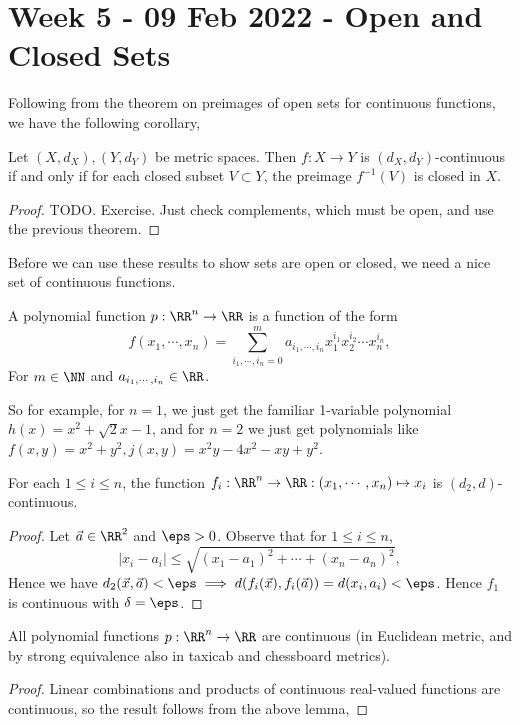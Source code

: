 \section{Week 5 - 09 Feb 2022 - Open and Closed Sets}
Following from the theorem on preimages of open sets for continuous functions,
we have the following corollary,
\begin{corollary}
  Let $(X,d_X), (Y,d_Y)$ be metric spaces. Then $f:X\to Y$ is
  $(d_X,d_Y)$-continuous if and only if for each closed subset $V\subset Y$, the
  preimage $f^{-1}(V)$ is closed in $X$.
\end{corollary}
\begin{proof}
  TODO. Exercise. Just check complements, which must be open, and use the
  previous theorem.
\end{proof}
Before we can use these results to show sets are open or closed, we need a nice
set of continuous functions.
\begin{definition}
  A polynomial function $p:\RR^n\to\RR$ is a function of the form
  \[f(x_1,\cdots, x_n) = \sum_{i_1,\cdots, i_n =0}^m a_{i_1,\cdots, i_n}
  x_1^{i_1}x_2^{i_2}\cdots x_n^{i_n},\]
  For $m\in\NN$ and $a_{i_1, \cdots, i_n}\in \RR$.
  \label{<+label+>}
\end{definition}
So for example, for $n=1$, we just get the familiar 1-variable polynomial
$h(x)=x^2+\sqrt{2}x-1$, and for $n=2$ we just get polynomials like
$f(x,y)=x^2+y^2, j(x,y)=x^2y-4x^2 -xy + y^2$.

\begin{lemma}
  For each $1\leq i\leq n$, the function $f_i:\RR^n\to\RR:(x_1,\cdots,
  x_n)\mapsto x_i$ is $(d_2,d)$-continuous.
  \label{<+label+>}
\end{lemma}
\begin{proof}
  Let $\vec{a}\in\RR^2$ and $\eps>0$. Observe that for $1\leq i \leq n$, 
  \[|x_i-a_i| \leq \sqrt{(x_1-a_1)^2 + \cdots + (x_n-a_n)^2},\]
  Hence we have $d_2(\vec{x},\vec{a})< \eps \implies
  d(f_i(\vec{x}),f_i(\vec{a}))=d(x_i,a_i)<\eps$. Hence $f_1$ is continuous with
  $\delta=\eps$.
\end{proof}

\begin{proposition}
  All polynomial functions $p:\RR^n\to\RR$ are continuous (in Euclidean metric,
  and by strong equivalence also in taxicab and chessboard metrics).
  \label{<+label+>}
\end{proposition}
\begin{proof}
  Linear combinations and products of continuous real-valued functions are
  continuous, so the result follows from the above lemma,
\end{proof}

